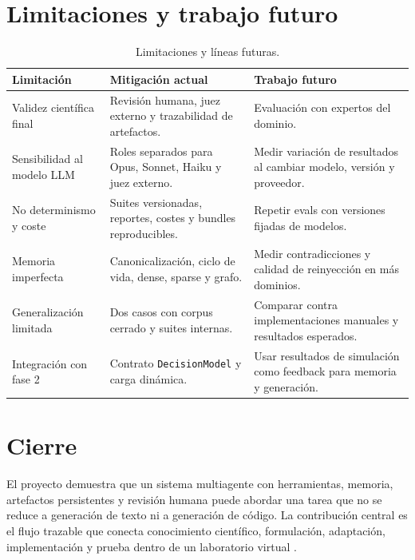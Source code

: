 \section{Limitaciones y trabajo futuro}

\begin{table}[H]
\begin{center}
\small
\begin{tabular}{|p{3.1cm}|p{4.9cm}|p{4.5cm}|} \hline
\textbf{Limitación} & \textbf{Mitigación actual} & \textbf{Trabajo futuro} \\ \hline
Validez científica final & Revisión humana, juez externo y trazabilidad de artefactos. & Evaluación con expertos del dominio. \\ \hline
Sensibilidad al modelo LLM & Roles separados para Opus, Sonnet, Haiku y juez externo. & Medir variación de resultados al cambiar modelo, versión y proveedor. \\ \hline
No determinismo y coste & Suites versionadas, reportes, costes y bundles reproducibles. & Repetir evals con versiones fijadas de modelos. \\ \hline
Memoria imperfecta & Canonicalización, ciclo de vida, dense, sparse y grafo. & Medir contradicciones y calidad de reinyección en más dominios. \\ \hline
Generalización limitada & Dos casos con corpus cerrado y suites internas. & Comparar contra implementaciones manuales y resultados esperados. \\ \hline
Integración con fase 2 & Contrato \texttt{DecisionModel} y carga dinámica. & Usar resultados de simulación como feedback para memoria y generación. \\ \hline
\end{tabular}
\caption{Limitaciones y líneas futuras.}
\end{center}
\end{table}

\section{Cierre}

El proyecto demuestra que un sistema multiagente con herramientas, memoria,
artefactos persistentes y revisión humana puede abordar una tarea que no se
reduce a generación de texto ni a generación de código. La contribución central
es el flujo trazable que conecta conocimiento científico, formulación,
adaptación, implementación y prueba dentro de un laboratorio virtual
\cite{yao2023react,lewis2020rag,packer2023memgpt,chen2021codex}.
